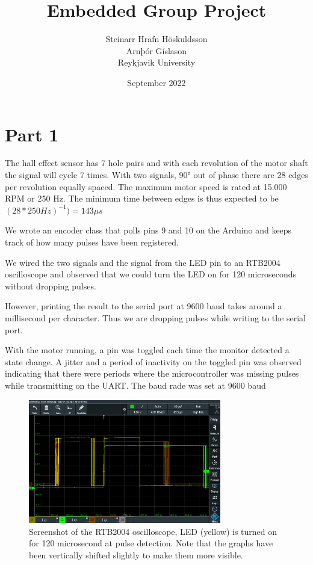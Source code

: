 \documentclass{article}
\title{Embedded Group Project}
\author{Steinarr Hrafn Höskuldsson\\
Arnþór Gíslason\\
Reykjavik University}
\date{September 2022}
\begin{document}
\maketitle

\section*{Part 1}
The hall effect sensor has 7 hole pairs and with each revolution of the motor shaft the signal will cycle 7 times. With two signals, 90° out of phase there are 28 edges per revolution equally spaced. The maximum motor speed is rated at 15.000 RPM or 250 Hz. The minimum time between edges is thus expected to be \((28*250Hz)^{-1}) = 143 \mu s\)

We wrote an encoder class that polls pins 9 and 10 on the Arduino and keeps track of how many pulses have been registered. 

We wired the two signals and the signal from the LED pin to an RTB2004 oscilloscope and observed that we could turn the LED on for 120 microseconds without dropping pulses. 


However, printing the result to the serial port at 9600 baud takes around a millisecond per character. Thus we are dropping pulses while writing to the serial port.


With the motor running, a pin was toggled each time the monitor detected a state change. A jitter and a period of inactivity on the toggled pin was observed indicating that there were periods where the microcontroller was missing pulses while transmitting on the UART. The baud rade was set at 9600 baud 

\begin{figure}[h]
    \centering
    \includegraphics[width=0.75\textwidth]{Project1RotaryEncoder/oscilloscope_part1_120ms.PNG}
    \caption{Screenshot of the RTB2004 oscilloscope, LED (yellow) is turned on for 120 microsecond at pulse detection. Note that the graphs have been vertically shifted slightly to make them more visible.}
    \label{fig:osc120}
\end{figure}
\end{document}
